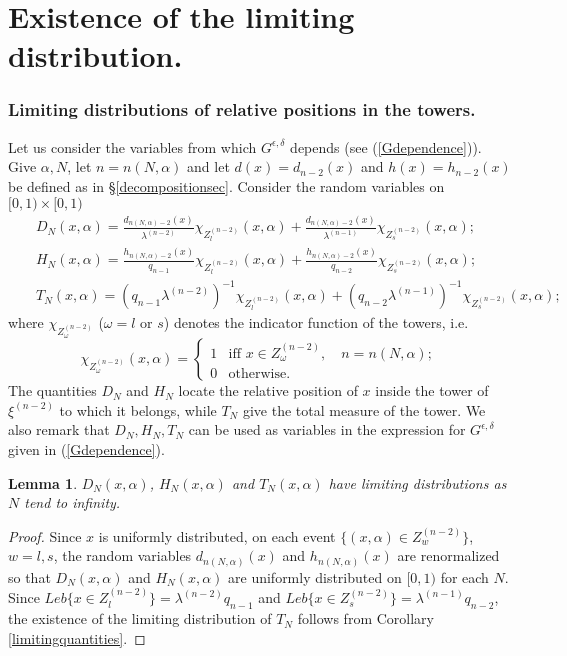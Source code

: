 \documentclass{conm-p-l}
\numberwithin{equation}{section}
\newtheorem{lemma}[theorem]{Lemma}
\begin{document}
\section{Existence of the limiting distribution.}\label{limitingsec}
\subsubsection*{Limiting distributions of relative positions in the towers.}\label{relativepositionsec}
Let us consider the variables from which $G^{\epsilon, \delta}$ depends (see (\ref{Gdependence})). 
Give $ \alpha, N$, let $n=n(N,\alpha)$ and let $d(x)=d_{n-2}(x)$ and $h(x)= h_{n-2}(x)$ be defined as in \S\ref{decompositionsec}.
Consider the random variables on $[0,1)\times[0,1)$
\begin{eqnarray} && D_N (x,\alpha ) = \frac{{d_{n(N,\alpha)-2}(x)}}{\lambda^{(n-2)}} \chi_{Z^{(n-2)}_l} (x,\alpha)+ \frac{{d_{n(N,\alpha)-2}(x)}}{\lambda^{(n-1)}} \chi_{Z^{(n-2)}_s} (x,\alpha);\label{DN} \\
&& H_N (x,\alpha ) = \frac{{h_{n(N,\alpha)-2}(x)}}{q_{n-1}} \chi_{Z^{(n-2)}_l}(x,\alpha) +   \frac{{h_{n(N,\alpha)-2}(x)}}{q_{n-2}} \chi_{Z^{(n-2)}_s}(x,\alpha);\label{HN}\\
&& T_N (x,\alpha ) = {(q_{n-1}\lambda^{(n-2)})}^{-1} \chi_{Z^{(n-2)}_l} (x,\alpha)+ {(q_{n-2}\lambda^{(n-1)})}^{-1} \chi_{Z^{(n-2)}_s} (x,\alpha);\label{TN}
\end{eqnarray}
where $\chi_{Z^{(n-2)}_\omega}$ ($\omega=l$ or $s$) denotes the indicator function of the towers, i.e.  
\begin{equation}
\chi_{Z^{(n-2)}_\omega}(x,\alpha)=\left\{ \begin{array}{ll}  1 & \mathrm{iff} \, \, x\in {Z^{(n-2)}_\omega}, \quad n=n(N,\alpha); \\ 0 & \mathrm{otherwise}. \end{array}\right.
\end{equation}
The quantities $D_N$ and  $H_N$ locate the relative position of $x $ inside the tower of $\xi^{(n-2)}$ to which it belongs, while $T_N$ give the total measure of the tower.
We also remark that  $D_N, H_N, T_N$ can be used as variables in the expression for $G^{\epsilon, \delta}$ given in (\ref{Gdependence}).
\begin{lemma}\label{limitingratios}
$ D_N (x,\alpha )$, $ H_N (x,\alpha )$ and $ T_N (x,\alpha )$ have  limiting distributions as $N$ tend to infinity.
\end{lemma}
\begin{proof}
Since  $x$ is uniformly distributed, on each event $\{ (x,\alpha) \in {Z^{(n-2)}_w} \}$, $w=l,s$, the random variables  ${d_{n(N,\alpha)}(x)}$ and  ${h_{n(N,\alpha)}(x)}$ are renormalized so that $ D_N (x,\alpha )$ and  $ H_N (x,\alpha )$ are uniformly distributed on $[0,1)$ for each $N$.  Since $Leb \{ x \in Z^{(n-2)}_l\} = \lambda^{(n-2)}q_{n-1}$ and $Leb \{x \in Z^{(n-2)}_s\} = \lambda^{(n-1)}q_{n-2}$,  the existence of the limiting distribution of  $T_N$ follows from Corollary \ref{limitingquantities}.

\end{proof}
\end{document}
